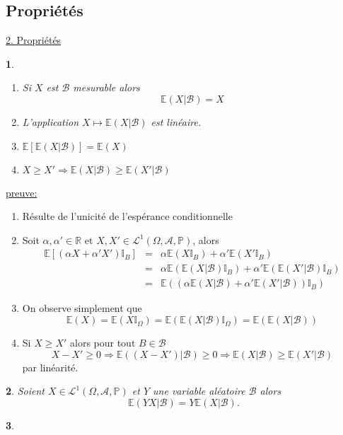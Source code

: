 \documentclass[8pt,notheorems]{beamer}
\def \E{\mathbb E}
\renewcommand{\Pr}{\mathbb{P}}
\newtheorem{prop}{\translate{Proposition}}
\theoremstyle{definition}
\theoremstyle{example}
\theoremstyle{mystyle}
\theoremstyle{plain}
\begin{document}
\subsection{Propriétés}
\begin{frame}[allowframebreaks]
\underline{2. Propriétés}\\
\begin{prop}
\begin{enumerate}
    \item Si $X$ est $\mathcal{B}$ mesurable alors 
    $$
    \E(X|\mathcal{B}) = X
    $$
    \item L'application $X\mapsto \E(X|\mathcal{B})$ est linéaire.
    \item $\E[\E(X|\mathcal{B})]  =\E(X)$
    \item $X\geq X' \Rightarrow \E(X|\mathcal{B})\geq \E(X'|\mathcal{B})$
\end{enumerate}
\end{prop}
\underline{preuve:}\\
\begin{enumerate}
    \item Résulte de l'unicité de l'espérance conditionnelle
    \item Soit $\alpha, \alpha'\in \mathbb{R}$ et $X,X'\in\mathcal{L}^1(\Omega, \mathcal{A},\Pr)$, alors 
    \begin{eqnarray*}
    \E[(\alpha X+\alpha'X')\mathbb{I}_B]&=&
    \alpha\E(X\mathbb{I}_B)+\alpha'\E(X'\mathbb{I}_B)\\
    &=&\alpha\E(\E(X|\mathcal{B})\mathbb{I}_B)+\alpha'\E(\E(X'|\mathcal{B})\mathbb{I}_B)\\
    &=&\E((\alpha\E(X|\mathcal{B})+\alpha'\E(X'|\mathcal{B}))\mathbb{I}_B)
    \end{eqnarray*}
    \item On observe simplement que
    $$
    \E(X) = \E(X\mathbb{I}_\Omega) = \E(\E(X|\mathcal{B})\mathbb{I}_\Omega) = \E(\E(X|\mathcal{B}))   
    $$ 
    \item Si $X\geq X'$ alors pour tout $B\in\mathcal{B}$
    $$
    X-X'\geq 0\Rightarrow \E((X-X')|\mathcal{B})\geq 0 \Rightarrow\E(X|\mathcal{B})\geq\E(X'|\mathcal{B})  
    $$ 
    par linéarité. 
\end{enumerate}
\begin{prop}
Soient $X\in\mathcal{L}^1(\Omega, \mathcal{A}, \Pr)$ et $Y$ une variable aléatoire $\mathcal{B}$ alors 
$$
\E(YX|\mathcal{B}) = Y\E(X|\mathcal{B}).
$$
\end{prop}
\begin{prop}

\end{prop}
\end{frame}
\end{document}
